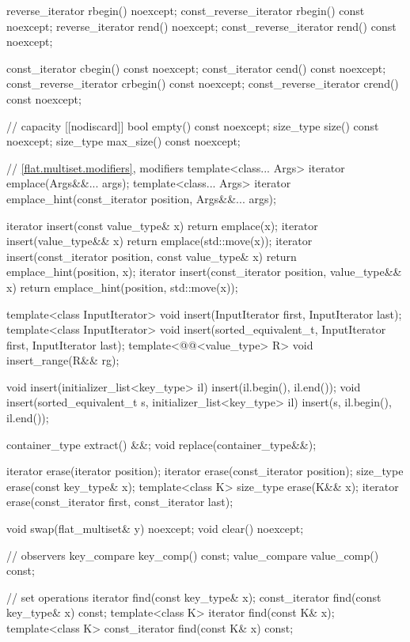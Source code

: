 \begin{codeblock}
{{    reverse_iterator       rbegin() noexcept;
    const_reverse_iterator rbegin() const noexcept;
    reverse_iterator       rend() noexcept;
    const_reverse_iterator rend() const noexcept;

    const_iterator         cbegin() const noexcept;
    const_iterator         cend() const noexcept;
    const_reverse_iterator crbegin() const noexcept;
    const_reverse_iterator crend() const noexcept;

    // capacity
    [[nodiscard]] bool empty() const noexcept;
    size_type size() const noexcept;
    size_type max_size() const noexcept;

    // \ref{flat.multiset.modifiers}, modifiers
    template<class... Args> iterator emplace(Args&&... args);
    template<class... Args>
      iterator emplace_hint(const_iterator position, Args&&... args);

    iterator insert(const value_type& x)
      { return emplace(x); }
    iterator insert(value_type&& x)
      { return emplace(std::move(x)); }
    iterator insert(const_iterator position, const value_type& x)
      { return emplace_hint(position, x); }
    iterator insert(const_iterator position, value_type&& x)
      { return emplace_hint(position, std::move(x)); }

    template<class InputIterator>
      void insert(InputIterator first, InputIterator last);
    template<class InputIterator>
      void insert(sorted_equivalent_t, InputIterator first, InputIterator last);
    template<@@<value_type> R>
      void insert_range(R&& rg);

    void insert(initializer_list<key_type> il)
      { insert(il.begin(), il.end()); }
    void insert(sorted_equivalent_t s, initializer_list<key_type> il)
      { insert(s, il.begin(), il.end()); }

    container_type extract() &&;
    void replace(container_type&&);

    iterator erase(iterator position);
    iterator erase(const_iterator position);
    size_type erase(const key_type& x);
    template<class K> size_type erase(K&& x);
    iterator erase(const_iterator first, const_iterator last);

    void swap(flat_multiset& y) noexcept;
    void clear() noexcept;

    // observers
    key_compare key_comp() const;
    value_compare value_comp() const;

    // set operations
    iterator find(const key_type& x);
    const_iterator find(const key_type& x) const;
    template<class K> iterator find(const K& x);
    template<class K> const_iterator find(const K& x) const;

}}
\end{codeblock}
